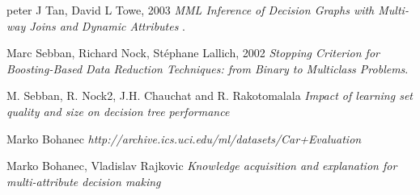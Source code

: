 \documentclass[a4paper, 12pt]{article}
\begin{document}
\clearpage
\begin{thebibliography}{9}
peter J Tan, David L Towe, 2003
\textit{MML Inference of Decision Graphs with Multi-way Joins and Dynamic Attributes
}.

  Marc Sebban, Richard Nock, Stéphane Lallich, 2002
  \textit{Stopping Criterion for Boosting-Based Data Reduction Techniques: from Binary to Multiclass Problems}.

  M. Sebban, R. Nock2, J.H. Chauchat and R. Rakotomalala
  \textit{Impact of learning set quality and size on decision tree performance}

  Marko Bohanec
  \textit{http://archive.ics.uci.edu/ml/datasets/Car+Evaluation}

  Marko Bohanec, Vladislav Rajkovic
  \textit{Knowledge acquisition and explanation for multi-attribute decision making}

 
\end{thebibliography}
\end{document}
